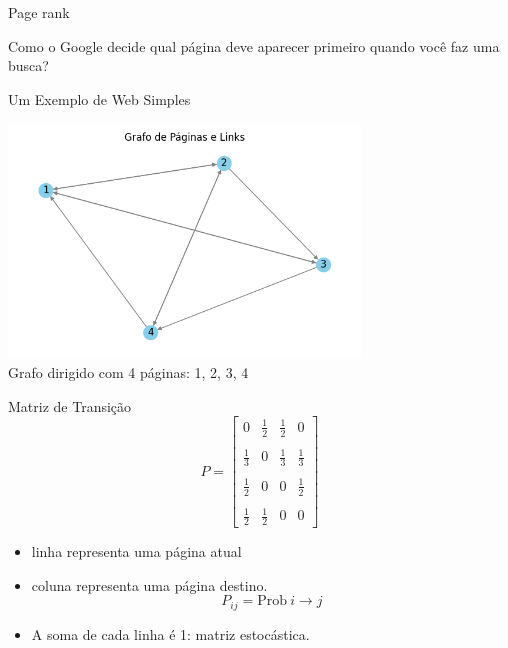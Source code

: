 \documentclass{beamer}
\begin{document}

\begin{frame}{Page rank}
\begin{block}{}
Como o Google decide qual página deve aparecer primeiro quando você faz uma busca?
\end{block}
\end{frame}


\begin{frame}{Um Exemplo de Web Simples}
\begin{center}
\includegraphics[width=0.7\textwidth]{web_grafo.png} \\
Grafo dirigido com 4 páginas: 1, 2, 3, 4
\end{center}
\end{frame}


\begin{frame}{Matriz de Transição}
  \[
    P = \begin{bmatrix}
      0 & \frac{1}{2} & \frac{1}{2} & 0 \\\\
      \frac{1}{3} & 0 & \frac{1}{3} & \frac{1}{3} \\\\
      \frac{1}{2} & 0 & 0 & \frac{1}{2} \\\\
      \frac{1}{2} & \frac{1}{2} & 0 & 0
    \end{bmatrix}
  \]
  \begin{itemize}
  \item  linha representa uma página atual
  \item coluna representa uma página destino.
      $$P_{ij} = \mathrm{Prob} ~i\to j$$%
  \item A soma de cada linha é 1: matriz estocástica.
  \end{itemize}
  
  
\end{frame}
\end{document}
